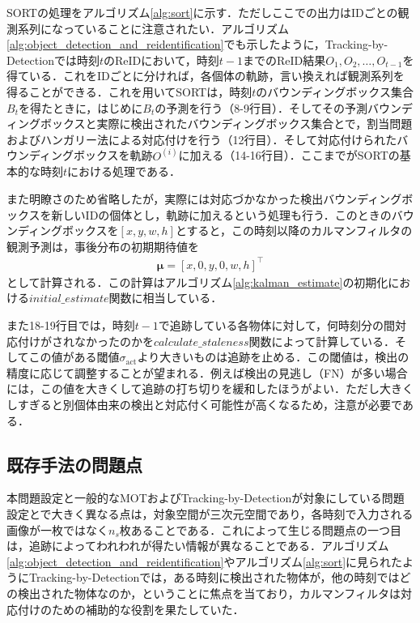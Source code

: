     SORTの処理をアルゴリズム\ref{alg:sort}に示す．ただしここでの出力はIDごとの観測系列になっていることに注意されたい．アルゴリズム\ref{alg:object_detection_and_reidentification}でも示したように，Tracking-by-Detectionでは時刻$t$のReIDにおいて，時刻$t-1$までのReID結果$O_1, O_2, \dots, O_{t-1}$を得ている．これをIDごとに分ければ，各個体の軌跡，言い換えれば観測系列を得ることができる．これを用いてSORTは，時刻$t$のバウンディングボックス集合$B_t$を得たときに，はじめに$B_t$の予測を行う（8-9行目）．そしてその予測バウンディングボックスと実際に検出されたバウンディングボックス集合とで，割当問題およびハンガリー法による対応付けを行う（12行目）．そして対応付けられたバウンディングボックスを軌跡$O^{(i)}$に加える（14-16行目）．ここまでがSORTの基本的な時刻$t$における処理である．
    
    また明瞭さのため省略したが，実際には対応づかなかった検出バウンディングボックスを新しいIDの個体とし，軌跡に加えるという処理も行う．このときのバウンディングボックスを$[x,y,w,h]$とすると，この時刻以降のカルマンフィルタの観測予測は，事後分布の初期期待値を
    \begin{equation}
        \label{eq:SORT_kalman_initialize}
        \begin{aligned}
            \bm{\mu} = \left[x, 0, y, 0, w, h\right]^{\top}
        \end{aligned}
    \end{equation}
    として計算される．この計算はアルゴリズム\ref{alg:kalman_estimate}の初期化における$initial\_estimate$関数に相当している．

    また18-19行目では，時刻$t-1$で追跡している各物体に対して，何時刻分の間対応付けがされなかったのかを$calculate\_staleness$関数によって計算している．そしてこの値がある閾値$\sigma_{\text{act}}$より大きいものは追跡を止める．この閾値は，検出の精度に応じて調整することが望まれる．例えば検出の見逃し（FN）が多い場合には，この値を大きくして追跡の打ち切りを緩和したほうがよい．ただし大きくしすぎると別個体由来の検出と対応付く可能性が高くなるため，注意が必要である．

    \subsection{既存手法の問題点}
    \label{subsec:existing_problem}

    本問題設定と一般的なMOTおよびTracking-by-Detectionが対象にしている問題設定とで大きく異なる点は，対象空間が三次元空間であり，各時刻で入力される画像が一枚ではなく$n_s$枚あることである．これによって生じる問題点の一つ目は，追跡によってわれわれが得たい情報が異なることである．アルゴリズム\ref{alg:object_detection_and_reidentification}やアルゴリズム\ref{alg:sort}に見られたようにTracking-by-Detectionでは，ある時刻に検出された物体が，他の時刻ではどの検出された物体なのか，ということに焦点を当ており，カルマンフィルタは対応付けのための補助的な役割を果たしていた．

